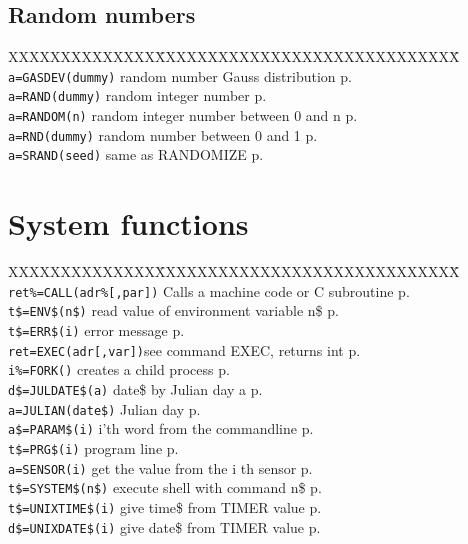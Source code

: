 \subsection{Random numbers}
\begin{tabbing}
XXXXXXXXXXXXXX\=XXXXXXXXXXXXXXXXXXXXXXXXXXXXX\=\kill\\
\verb|a=GASDEV(dummy)| 	\> random number Gauss distribution \> p.\pageref{GASDEV}\\
\verb|a=RAND(dummy)|	\> random integer number \> p.\pageref{RAND}\\
\verb|a=RANDOM(n)|	\> random integer number between 0 and n \> p.\pageref{RANDOM}\\
\verb|a=RND(dummy)|	\> random number between 0 and 1 \> p.\pageref{RND}\\
\verb|a=SRAND(seed)|	\> same as RANDOMIZE \> p.\pageref{SRAND}\\

\end{tabbing}


\section{System functions}
\begin{tabbing}
XXXXXXXXXXXXXX\=XXXXXXXXXXXXXXXXXXXXXXXXXXXXX\=\kill\\
\verb|ret%=CALL(adr%[,par])|\> Calls a machine code or C subroutine \> p.\pageref{CALL}\\
\verb|t$=ENV$(n$)|	\>  read value of environment variable n\$\> p.\pageref{ENVS}\\
\verb|t$=ERR$(i)| \> error message\> p.\pageref{ERRS}\\
\verb|ret=EXEC(adr[,var])|\>see command EXEC, returns int\> p.\pageref{EXEC}\\
\verb|i%=FORK()| \> creates a child process \> p.\pageref{FORK}\\
\verb|d$=JULDATE$(a)|  	\>date\$ by Julian day a\> p.\pageref{JULDATES}\\
\verb|a=JULIAN(date$)| 	\>Julian day\> p.\pageref{JULIAN}\\
\verb|a$=PARAM$(i)| \> i'th word from the commandline \> p.\pageref{PARAMS}\\
\verb|t$=PRG$(i)| \> program line\> p.\pageref{PRGS}\\
\verb|a=SENSOR(i)| \> get the value from the i th sensor \> p.\pageref{SENSOR}\\
\verb|t$=SYSTEM$(n$)| \>execute shell with command n\$\> p.\pageref{SYSTEMS}\\
\verb|t$=UNIXTIME$(i)| \>give time\$ from TIMER value\> p.\pageref{UNIXTIMES}\\
\verb|d$=UNIXDATE$(i)| \>give date\$ from TIMER value\> p.\pageref{UNIXDATES}\\
\end{tabbing}

